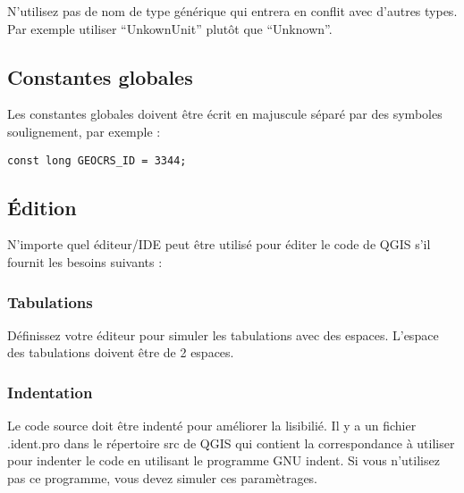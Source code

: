 N'utilisez pas de nom de type générique qui entrera en conflit avec d'autres types. Par exemple utiliser ``UnkownUnit'' plutôt que ``Unknown''.

\subsection{Constantes globales}
Les constantes globales doivent être écrit en majuscule séparé par des symboles soulignement, par exemple :
\begin{verbatim}
const long GEOCRS_ID = 3344;
\end{verbatim}

\subsection{Édition}
N'importe quel éditeur/IDE peut être utilisé pour éditer le code de QGIS s'il fournit les besoins suivants :

\subsubsection{Tabulations}
Définissez votre éditeur pour simuler les tabulations avec des espaces. L'espace des tabulations doivent être de 2 espaces.

\subsubsection{Indentation}
Le code source doit être indenté pour améliorer la lisibilié. Il y a un fichier .ident.pro dans le répertoire src de QGIS qui contient la correspondance à utiliser pour indenter le code en utilisant le programme GNU indent. Si vous n'utilisez pas ce programme, vous devez simuler ces paramètrages.

